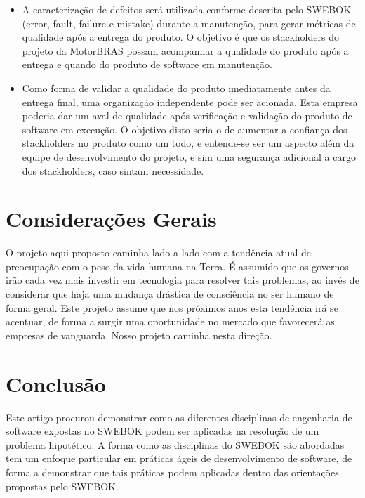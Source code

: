 \documentclass[12pt,journal,compsoc]{IEEEtran}
\begin{document}
\begin{itemize}
\item A caracterização de defeitos será utilizada conforme descrita pelo SWEBOK \cite{society_software_2004} (error, fault, failure e mistake) durante a manutenção, para gerar métricas de qualidade após a entrega do produto. O objetivo é que os stackholders do projeto da MotorBRAS possam acompanhar a qualidade do produto após a entrega e quando do produto de software em manutenção.
\item Como forma de validar a qualidade do produto imediatamente antes da entrega final, uma organização independente pode ser acionada. Esta empresa poderia dar um aval de qualidade após verificação e validação do produto de software em execução. O objetivo disto seria o de aumentar a confiança dos stackholders no produto como um todo, e entende-se ser um aspecto além da equipe de desenvolvimento do projeto, e sim uma segurança adicional a cargo dos stackholders, caso sintam necessidade. 
\end{itemize}


\section{Considerações Gerais}

O projeto aqui proposto caminha lado-a-lado com a tendência atual de preocupação com o peso da vida humana na Terra. É assumido que os governos irão cada vez mais investir em tecnologia para resolver tais problemas, ao invés de considerar que haja uma mudança drástica de consciência no ser humano de forma geral. Este projeto assume que nos próximos anos esta tendência irá se acentuar, de forma a surgir uma oportunidade no mercado que favorecerá as empresas de vanguarda. Nosso projeto caminha nesta direção. 


\section{Conclusão}

Este artigo procurou demonstrar como as diferentes disciplinas de engenharia de software expostas no SWEBOK podem ser aplicadas na resolução de um problema hipotético. A forma como as disciplinas do SWEBOK são abordadas tem um enfoque particular em práticas ágeis de desenvolvimento de software, de forma a demonstrar que tais práticas podem aplicadas dentro das orientações propostas pelo SWEBOK.



\end{document}
